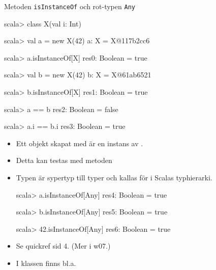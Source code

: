 \begin{Slide}{Metoden \texttt{isInstanceOf} och rot-typen \texttt{Any}}
\SlideFontSmall\vspace{-0.5em}
\begin{multicols}{2}

\begin{REPL}
scala> class X(val i: Int) 

scala> val a = new X(42)
a: X = X@117b2cc6

scala> a.isInstanceOf[X]
res0: Boolean = true

scala> val b = new X(42)
b: X = X@61ab6521

scala> b.isInstanceOf[X]
res1: Boolean = true

scala> a == b
res2: Boolean = false

scala> a.i == b.i
res3: Boolean = true

\end{REPL}

\columnbreak


\begin{itemize}\SlideFontTiny

\item Ett objekt skapat med  är en instans av  . 

\item Detta kan testas med metoden 

\pause

\item Typen  är sypertyp till  typer och kallas för  i Scalas  typhierarki. 

\begin{REPL}
scala> a.isInstanceOf[Any]
res4: Boolean = true

scala> b.isInstanceOf[Any]
res5: Boolean = true

scala> 42.isInstanceOf[Any]
res6: Boolean = true

\end{REPL}
\item Se quickref sid 4. (Mer i w07.) 
\item I klassen \href{http://www.scala-lang.org/api/current/#scala.Any}{} finns bl.a. 
\end{itemize}
\end{multicols}
\end{Slide}



